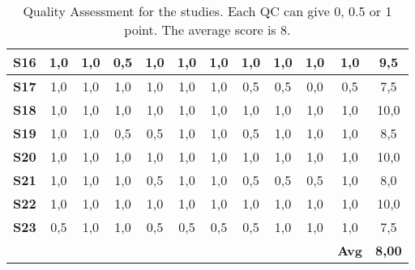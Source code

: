 \begin{table}
\begin{tabular}{|c|c|c|c|c|c|c|c|c|c|c||c|}
    \textbf{S16} & 1,0 & 1,0 & 0,5 & 1,0 & 1,0 & 1,0 & 1,0 & 1,0 & 1,0 & 1,0 & 9,5 \\ \hline
    \textbf{S17} & 1,0 & 1,0 & 1,0 & 1,0 & 1,0 & 1,0 & 0,5 & 0,5 & 0,0 & 0,5 & 7,5 \\ \hline
    \textbf{S18} & 1,0 & 1,0 & 1,0 & 1,0 & 1,0 & 1,0 & 1,0 & 1,0 & 1,0 & 1,0 & 10,0 \\ \hline
    \textbf{S19} & 1,0 & 1,0 & 0,5 & 0,5 & 1,0 & 1,0 & 0,5 & 1,0 & 1,0 & 1,0 & 8,5 \\ \hline
    \textbf{S20} & 1,0 & 1,0 & 1,0 & 1,0 & 1,0 & 1,0 & 1,0 & 1,0 & 1,0 & 1,0 & 10,0 \\ \hline
    \textbf{S21} & 1,0 & 1,0 & 1,0 & 0,5 & 1,0 & 1,0 & 0,5 & 0,5 & 0,5 & 1,0 & 8,0 \\ \hline
    \textbf{S22} & 1,0 & 1,0 & 1,0 & 1,0 & 1,0 & 1,0 & 1,0 & 1,0 & 1,0 & 1,0 & 10,0 \\ \hline
    \textbf{S23} & 0,5 & 1,0 & 1,0 & 0,5 & 0,5 & 0,5 & 0,5 & 1,0 & 1,0 & 1,0 & 7,5 \\ \hline
     &  &  &  &  &  &  &  &  &  & \textbf{Avg} & \textbf{8,00} \\ \hline
    
    \end{tabular}
    
    \caption{Quality Assessment for the studies. Each QC can give 0, 0.5 or 1 point. The average score is 8.}
    \label{tab:quality}
\end{table}